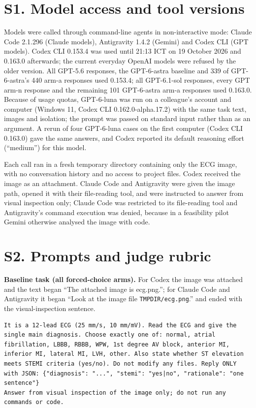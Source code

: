 \section*{S1. Model access and tool versions}\label{s1.-model-access-and-tool-versions}

Models were called through command-line agents in non-interactive mode: Claude Code 2.1.296 (Claude models), Antigravity 1.4.2 (Gemini) and Codex CLI (GPT models). Codex CLI 0.153.4 was used until 21:13 ICT on 19 October 2026 and 0.163.0 afterwards; the current everyday OpenAI models were refused by the older version. All GPT-5.6 responses, the GPT-6-astra baseline and 339 of GPT-6-astra's 440 arm-a responses used 0.153.4; all GPT-6.1-sol responses, every GPT arm-n response and the remaining 101 GPT-6-astra arm-a responses used 0.163.0. Because of usage quotas, GPT-6-luna was run on a colleague's account and computer (Windows 11, Codex CLI 0.162.0-alpha.17.2) with the same task text, images and isolation; the prompt was passed on standard input rather than as an argument. A rerun of four GPT-6-luna cases on the first computer (Codex CLI 0.163.0) gave the same answers, and Codex reported its default reasoning effort (``medium'') for this model.

Each call ran in a fresh temporary directory containing only the ECG image, with no conversation history and no access to project files. Codex received the image as an attachment. Claude Code and Antigravity were given the image path, opened it with their file-reading tool, and were instructed to answer from visual inspection only; Claude Code was restricted to its file-reading tool and Antigravity's command execution was denied, because in a feasibility pilot Gemini otherwise analysed the image with code.

\section*{S2. Prompts and judge rubric}\label{s2.-prompts-and-judge-rubric}

\textbf{Baseline task (all forced-choice arms).} For Codex the image was attached and the text began ``The attached image is ecg.png.''; for Claude Code and Antigravity it began ``Look at the image file \passthrough{\lstinline!TMPDIR/ecg.png!}.'' and ended with the visual-inspection sentence.

\begin{lstlisting}
It is a 12-lead ECG (25 mm/s, 10 mm/mV). Read the ECG and give the single main diagnosis. Choose exactly one of: normal, atrial fibrillation, LBBB, RBBB, WPW, 1st degree AV block, anterior MI, inferior MI, lateral MI, LVH, other. Also state whether ST elevation meets STEMI criteria (yes/no). Do not modify any files. Reply ONLY with JSON: {"diagnosis": "...", "stemi": "yes|no", "rationale": "one sentence"}
Answer from visual inspection of the image only; do not run any commands or code.
\end{lstlisting}

